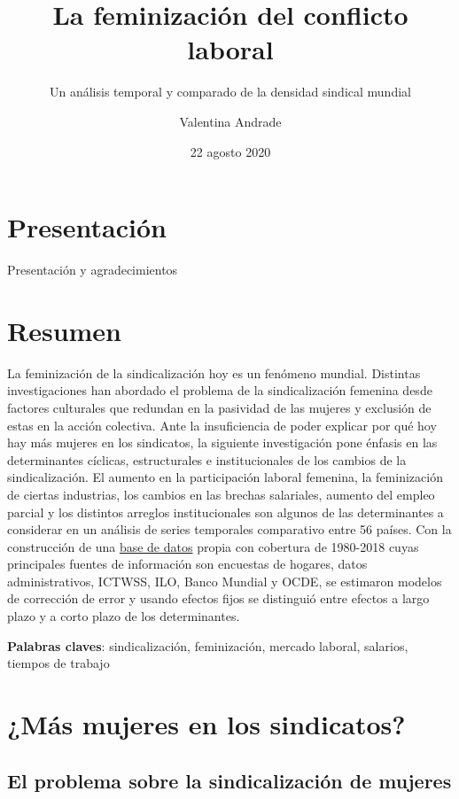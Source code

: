 \documentclass[
]{book}
\title{La feminización del conflicto laboral}
\subtitle{Un análisis temporal y comparado de la densidad sindical mundial}
\author{Valentina Andrade}
\date{22 agosto 2020}
\begin{document}
\maketitle

{
\setcounter{tocdepth}{1}
\tableofcontents
}
\hypertarget{presentaciuxf3n}{%
\chapter*{Presentación}\label{presentaciuxf3n}}

Presentación y agradecimientos

\hypertarget{resumen}{%
\chapter*{Resumen}\label{resumen}}

La feminización de la sindicalización hoy es un fenómeno mundial. Distintas investigaciones han abordado el problema de la sindicalización femenina desde factores culturales que redundan en la pasividad de las mujeres y exclusión de estas en la acción colectiva. Ante la insuficiencia de poder explicar por qué hoy hay más mujeres en los sindicatos, la siguiente investigación pone énfasis en las determinantes cíclicas, estructurales e institucionales de los cambios de la sindicalización. El aumento en la participación laboral femenina, la feminización de ciertas industrias, los cambios en las brechas salariales, aumento del empleo parcial y los distintos arreglos institucionales son algunos de las determinantes a considerar en un análisis de series temporales comparativo entre 56 países. Con la construcción de una \href{../output/data}{base de datos} propia con cobertura de 1980-2018 cuyas principales fuentes de información son encuestas de hogares, datos administrativos, ICTWSS, ILO, Banco Mundial y OCDE, se estimaron modelos de corrección de error y usando efectos fijos se distinguió entre efectos a largo plazo y a corto plazo de los determinantes.

\textbf{Palabras claves}: sindicalización, feminización, mercado laboral, salarios, tiempos de trabajo

\hypertarget{intro}{%
\chapter{¿Más mujeres en los sindicatos?}\label{intro}}

\hypertarget{el-problema-sobre-la-sindicalizaciuxf3n-de-mujeres}{%
\section{El problema sobre la sindicalización de mujeres}\label{el-problema-sobre-la-sindicalizaciuxf3n-de-mujeres}}
\end{document}
